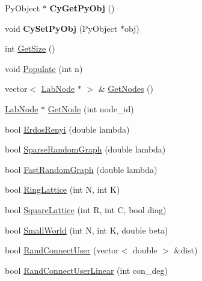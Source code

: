 \begin{DoxyCompactItemize}
\item 
\hypertarget{classelps_1_1_lab_network_a674651582ec450891a1815045b1125ce}{Py\+Object $\ast$ {\bfseries Cy\+Get\+Py\+Obj} ()}\label{classelps_1_1_lab_network_a674651582ec450891a1815045b1125ce}

\item 
\hypertarget{classelps_1_1_lab_network_aa060063def738dba5e8a179dc51688cd}{void {\bfseries Cy\+Set\+Py\+Obj} (Py\+Object $\ast$obj)}\label{classelps_1_1_lab_network_aa060063def738dba5e8a179dc51688cd}

\item 
int \hyperlink{classelps_1_1_lab_network_ad9ba49a3e440387c3a7f26694faea9e2}{Get\+Size} ()
\item 
void \hyperlink{classelps_1_1_lab_network_ae07f023a5b2cd7f2e5646343c27165cf}{Populate} (int n)
\item 
vector$<$ \hyperlink{classelps_1_1_lab_node}{Lab\+Node} $\ast$ $>$ \& \hyperlink{classelps_1_1_lab_network_a735c4555caac87a1b4f892ed5afafe87}{Get\+Nodes} ()
\item 
\hyperlink{classelps_1_1_lab_node}{Lab\+Node} $\ast$ \hyperlink{classelps_1_1_lab_network_a789165972661c5ce76d08fc8e08f0dea}{Get\+Node} (int node\+\_\+id)
\item 
bool \hyperlink{classelps_1_1_lab_network_ace3bdd2d65f5d00464cb8abf06fdf3af}{Erdos\+Renyi} (double lambda)
\item 
bool \hyperlink{classelps_1_1_lab_network_a49abb9e7a22963fba022c65748ec4242}{Sparse\+Random\+Graph} (double lambda)
\item 
bool \hyperlink{classelps_1_1_lab_network_a0bbd4e833feb4641793830f9f3566127}{Fast\+Random\+Graph} (double lambda)
\item 
bool \hyperlink{classelps_1_1_lab_network_a5ae5c0c311459d444f040eaf43717abc}{Ring\+Lattice} (int N, int K)
\item 
bool \hyperlink{classelps_1_1_lab_network_a7f11fbd1df3dfcf6d81ba1473137ec9c}{Square\+Lattice} (int R, int C, bool diag)
\item 
bool \hyperlink{classelps_1_1_lab_network_a7517a4afba40876c2d55ecbd9512a1c7}{Small\+World} (int N, int K, double beta)
\item 
bool \hyperlink{classelps_1_1_lab_network_ad407f3fba34f4bbe0cbe9ba867dc54d0}{Rand\+Connect\+User} (vector$<$ double $>$ \&dist)
\item 
bool \hyperlink{classelps_1_1_lab_network_a4307b2b2c673f7e834f60ea3a4e8673f}{Rand\+Connect\+User\+Linear} (int con\+\_\+deg)
\item 

\end{DoxyCompactItemize}
